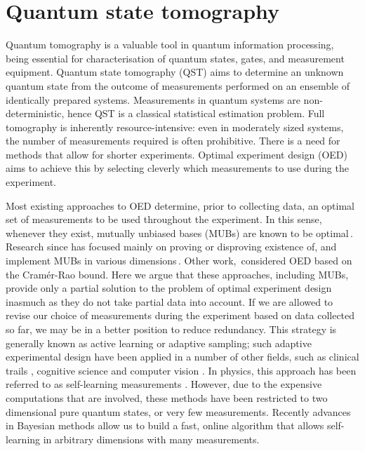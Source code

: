 \chapter{Quantum state tomography}

Quantum tomography is a valuable tool in quantum information processing, being essential for characterisation of quantum states, gates, and measurement equipment.  Quantum state tomography (QST) aims to determine an unknown quantum state from the outcome of measurements performed on an ensemble of identically prepared systems. Measurements in quantum systems are non-deterministic, hence QST is a classical statistical estimation problem. Full tomography is inherently resource-intensive: even in moderately sized systems, the number of measurements required is often prohibitive.
There is a need for methods that allow for shorter experiments. Optimal experiment design (OED) aims to achieve this by selecting cleverly which measurements to use during the experiment.

Most existing approaches to OED determine, prior to collecting data, an optimal set of measurements to be used throughout the experiment. In this sense, whenever they exist, mutually unbiased bases (MUBs) are known to be optimal\,\citep{MUBFirst,MUBExperiment}. Research since has focused mainly on proving or disproving existence of, and implement MUBs in various dimensions\,\citep{DimensionSix,MUBQutrit,MUBExperiment}. Other work,\,\citep{OEDFirst,OEDAverage} considered OED based on the Cram\'{e}r-Rao bound. Here we argue that these approaches, including MUBs, provide only a partial solution to the problem of optimal experiment design inasmuch as they do not take partial data into account. If we are allowed to revise our choice of measurements during the experiment based on data collected so far, we may be in a better position to reduce redundancy. This strategy is generally known as active learning or adaptive sampling; such adaptive experimental design have been applied in a number of other fields, such as clinical trails \citep{Berry2006}, cognitive science \citep{Cavagnaro2010} and computer vision \citep{Vondrick2011}. In physics, this approach has been referred to as self-learning measurements \citep{SelfLearning, SelfLearningExperimental}. However, due to the expensive computations that are involved, these methods have been restricted to two dimensional pure quantum states, or very few measurements. Recently advances in Bayesian methods allow us to build a fast, online algorithm that allows self-learning in arbitrary dimensions with many measurements. 

